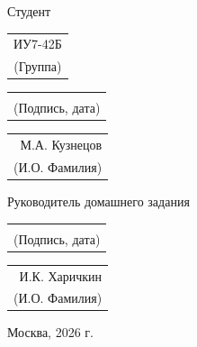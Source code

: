 \documentclass[a4paper, 14pt]{extarticle}
\begin{document}
\begin{titlepage}
    \vspace*{3cm}

    \begin{flushright}
        \begin{minipage}{1\textwidth}
            \large
            
            \small
            Студент 
            \begin{tabular}[t]{c}
                ИУ7-42Б \\
                {\footnotesize (Группа)}
            \end{tabular}
            \hfill
            \begin{tabular}[t]{p{3.5cm}}
                \underline{\hspace{3.5cm}} \\
                \centering\footnotesize (Подпись, дата)
            \end{tabular}
            \begin{tabular}[t]{r}
                М.А. Кузнецов \\
                {\footnotesize (И.О. Фамилия)}
            \end{tabular}

            \vspace*{1.0cm} %

            Руководитель домашнего задания 
            \hfill
            \begin{tabular}[t]{p{3.5cm}}
                \underline{\hspace{3.5cm}} \\
                \centering\footnotesize (Подпись, дата)
            \end{tabular}
            \begin{tabular}[t]{r}
                И.К. Харичкин \\
                \footnotesize (И.О. Фамилия)
            \end{tabular}
        \end{minipage}
    \end{flushright}

    \vfill

    \begin{center}
        {\large Москва, 2026 г.}
    \end{center}
\end{titlepage}
\end{document}
